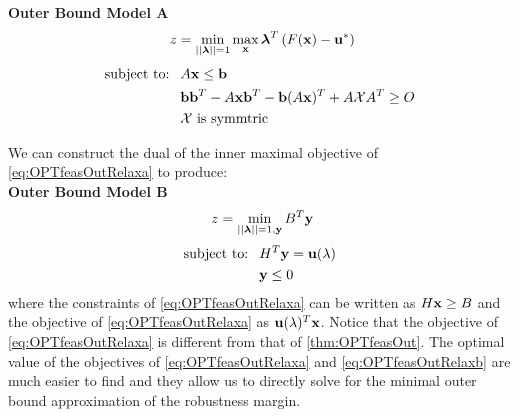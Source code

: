 \textbf{Outer Bound Model A}
\begin{equation}\label{eq:OPTfeasOutRelaxa}
 \ z=\min\limits_{||\boldsymbol{\lambda}||=1}\max\limits_{\mathbf{x}} \boldsymbol{\lambda}^T\left(F(\mathbf{x})-\mathbf{u}^*\right)
\end{equation}
\begin{align*}
 \text{subject to: } \ & A\mathbf{x}\leq \mathbf{b} \\
 	&\mathbf{b}\mathbf{b}^T-A\mathbf{x}\mathbf{b}^T-\mathbf{b}(A\mathbf{x})^T+A\mathcal{X}A^T\geq O \\
 	&\mathcal{X} \text{ is symmtric}
\end{align*}


We can construct the dual of the inner maximal objective of \cref{eq:OPTfeasOutRelaxa} to produce: \\

\textbf{Outer Bound Model B} 
\begin{equation}\label{eq:OPTfeasOutRelaxb}
\ z=\min\limits_{||\boldsymbol{\lambda}||=1,\mathbf{y}}B^T\mathbf{y}  
\end{equation}
\begin{align*}
 \text{subject to: } \ & H^T\mathbf{y}=\mathbf{u}(\lambda) \\
 & \mathbf{y}\leq 0
\end{align*}
where the constraints of \cref{eq:OPTfeasOutRelaxa} can be written as $H\mathbf{x}\geq B$ and the objective of \cref{eq:OPTfeasOutRelaxa} as $\mathbf{u}(\lambda)^T\mathbf{x}$. 
Notice that the objective of \cref{eq:OPTfeasOutRelaxa} is different from that of \cref{thm:OPTfeasOut}. 
The optimal value of the objectives of  \cref{eq:OPTfeasOutRelaxa} and \cref{eq:OPTfeasOutRelaxb} are much easier to find and they allow us to directly solve for the minimal outer bound approximation of the robustness margin. 

